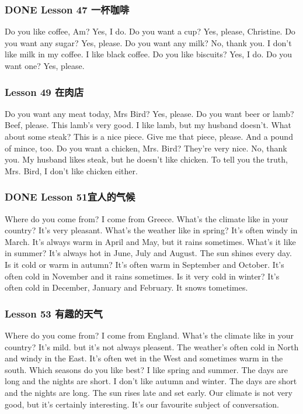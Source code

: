 \documentclass[11pt]{ctexart}
\begin{document}
\subsubsection{{\bfseries\sffamily DONE} Lesson 47 一杯咖啡}
\label{sec:org744eca4}
Do you like coffee, Am?
Yes, I do.
Do you want a cup?
Yes, please, Christine.
Do you want any sugar?
Yes, please.
Do you want any milk?
No, thank you.
I don't like milk in my coffee.
I like black coffee.
Do you like biscuits?
Yes, I do.
Do you want one?
Yes, please.
\subsubsection{Lesson 49 在肉店}
\label{sec:org1a2d0b6}
Do you want any meat today, Mrs Bird?
Yes, please.
Do you want beer or lamb?
Beef, please.
This lamb's very good.
I like lamb,
but my husband doesn't.
What about some steak?
This is a nice piece.
Give me that piece, please.
And a pound of mince, too.
Do you want a chicken, Mrs. Bird?
They're very nice.
No, thank you.
My husband likes steak,
but he doesn't like chicken.
To tell you the truth, Mrs. Bird,
I don't like chicken either.
\subsubsection{{\bfseries\sffamily DONE} Lesson 51宜人的气候}
\label{sec:orga4afeac}
Where do you come from?
I come from Greece.
What's the climate like in your country?
It's very pleasant.
What's the weather like in spring?
It's often windy in March.
It's always warm in April and May,
but it rains sometimes.
What's it like in summer?
It's always hot in June, July and August.
The sun shines every day.
Is it cold or warm in autumn?
It's often warm in September and October.
It's often cold in November and it rains sometimes.
Is it very cold in winter?
It's often cold in December, January and February.
It snows tometimes.
\subsubsection{Lesson 53 有趣的天气}
\label{sec:org003b055}
Where do you come from?
I come from England.
What's the climate like in your country?
It's mild.
but it's not always pleasent.
The weather's often cold in North
and windy in the East.
It's often wet in the West and sometimes warm in the south.
Which seasons do you like best?
I like spring and summer.
The days are long and the nights are short.
I don't like autumn and winter.
The days are short and the nights are long.
The sun rises late and set early.
Our climate is not very good,
but it's certainly interesting.
It's our favourite subject of conversation.
\end{document}
